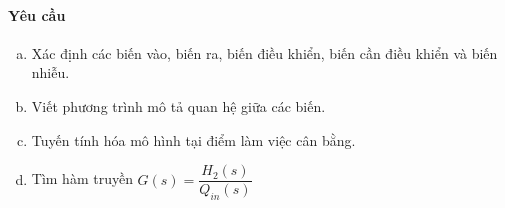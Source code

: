 \documentclass[12pt,a4paper]{article}
\begin{document}
    \paragraph{Yêu cầu}
        \begin{enumerate}[a.]
            \item Xác định các biến vào, biến ra, biến điều khiển, biến cần điều khiển và biến nhiễu.
            \item Viết phương trình mô tả quan hệ giữa các biến.
            \item Tuyến tính hóa mô hình tại điểm làm việc cân bằng.
            \item Tìm hàm truyền $G(s) = \dfrac{H_2(s)}{Q_{in}(s)}$
        \end{enumerate}
\end{document}
